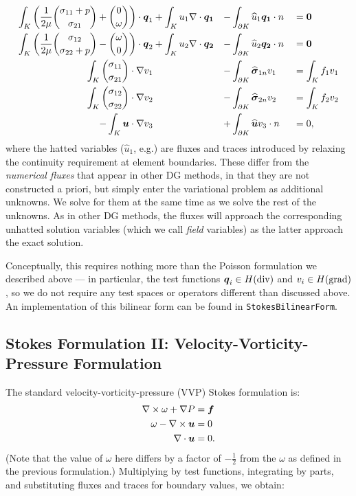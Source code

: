 \begin{align*}
\int_{K} \left(\frac{1}{2 \mu}{\sigma_{11} + p \choose \sigma_{21}} + {0 \choose \omega} \right) \cdot \vect{q}_{1} &+ \int_{K} u_{1} \NVRdiv \vect{q_{1}} &-& \int_{\partial K} \widehat{u}_{1} \vect{q_{1}} \cdot n &&=\vect{0} \\
\int_{K} \left(\frac{1}{2 \mu}{\sigma_{12} \choose \sigma_{22} + p} - {\omega \choose 0}\right) \cdot \vect{q}_{2} &+ \int_{K} u_{2} \NVRdiv \vect{q_{2}} &-& \int_{\partial K} \widehat{u}_{2} \vect{q_{2}} \cdot n &&= \vect{0}\\
\int_{K}  {\sigma_{11} \choose \sigma_{21}} \cdot \NVRgrad v_{1} &&-& \int_{\partial K} \widehat{\vect{\sigma}}_{1n} v_{1} &&= \int_{K} f_{1} v_{1} \\
\int_{K} {\sigma_{12} \choose \sigma_{22}} \cdot \NVRgrad v_{2} &&-& \int_{\partial K} \widehat{\vect{\sigma}}_{2n} v_{2}  &&= \int_{K} f_{2} v_{2} \\
-\int_{K} \vect{u} \cdot \NVRgrad v_{3} &&+& \int_{\partial K} \widehat{\vect{u}} v_{3} \cdot n &&= 0,
\end{align*}
where the hatted variables ($\widehat{u}_{1}$, e.g.) are fluxes and traces introduced by relaxing the continuity requirement at element boundaries.  These differ from the \emph{numerical fluxes} that appear in other DG methods, in that they are not constructed a priori, but simply enter the variational problem as additional unknowns. We solve for them at the same time as we solve 
the rest of the unknowns.  As in other DG methods, the fluxes will approach the corresponding unhatted solution variables (which we call \emph{field} variables) as the latter approach the exact solution.

Conceptually, this requires nothing more than the Poisson formulation we described above --- in particular, the test functions $\vect{q}_{i} \in \NVRHdiv$ and $v_{i} \in \NVRHgrad$, so we do not require any test spaces or operators different than discussed above.  An implementation of this bilinear form can be found in \verb=StokesBilinearForm=.

\subsection{Stokes Formulation II: Velocity-Vorticity-Pressure Formulation}  The standard velocity-vorticity-pressure (VVP) Stokes formulation is:
\begin{align*}
\NVRcurl \omega + \NVRgrad P &= \vect{f}\\
\omega - \NVRcurl \vect{u} &= 0\\
\NVRdiv \vect{u} &= 0.
\end{align*}
(Note that the value of $\omega$ here differs by a factor of $-\frac{1}{2}$ from the $\omega$ as defined in the previous formulation.)  Multiplying by test functions, integrating by parts, and substituting fluxes and traces for boundary values, we obtain:

